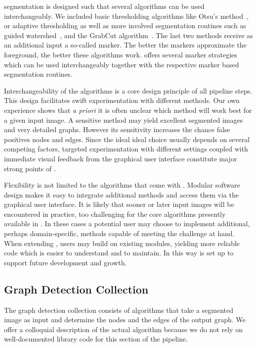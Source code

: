 		\NEFIs segmentation is designed such that several algorithms can be used interchangeably. We included basic thresholding algorithms like Otsu's method~\cite{otsu1979}, or adaptive thresholding as well as more involved segmentation routines such as guided watershed~\cite{watershed91}, and the GrabCut algorithm~\cite{grabcut2004}. The last two methods receive as an additional input a so-called marker. The better the markers approximate the foreground, the better these algorithms work. \NEFI offers several marker strategies which can be used interchangeably together with the respective marker based segmentation routines. 

		Interchangeability of the algorithms is a core design principle of all pipeline steps. This design facilitates swift experimentation with different methods. Our own experience shows that \emph{a priori} it is often unclear which method will work best for a given input image. A sensitive method may yield excellent segmented images and very detailed graphs. However its sensitivity increases the chance false positives nodes and edges. Since the ideal ideal choice usually depends on several competing factors, targeted experimentation with different settings coupled with immediate visual feedback from the graphical user interface constitute major strong points of \NEFI.

		Flexibility is not limited to the algorithms that come with \NEFI. Modular software design makes it easy to integrate additional methods and access them via the graphical user interface. It is likely that sooner or later input images will be encountered in practice, too challenging for the core algorithms presently available in \NEFI. In these cases a potential user may choose to implement additional, perhaps domain-specific, methods capable of meeting the challenge at hand. When extending \NEFI, users may build on existing modules, yielding more reliable code which is easier to understand and to maintain. In this way \NEFI is set up to support future development and growth.

	\subsection{Graph Detection Collection} 

		The graph detection collection consists of algorithms that take a segmented image as input and determine the nodes and the edges of the output graph. We offer a colloquial description of the actual algorithm because we do not rely on well-documented library code for this section of the pipeline. 

